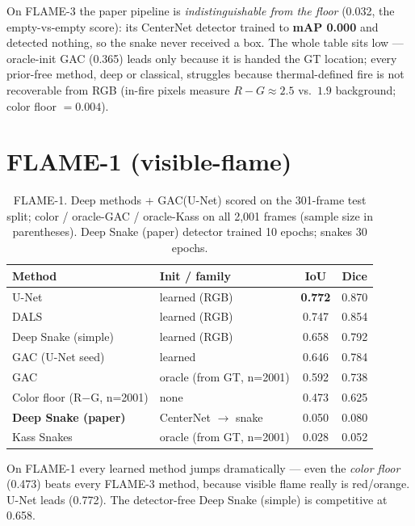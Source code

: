 \documentclass[10pt]{article}
\begin{document}
On FLAME-3 the paper pipeline is \emph{indistinguishable from the floor} (0.032,
the empty-vs-empty score): its CenterNet detector trained to \textbf{mAP 0.000} and
detected nothing, so the snake never received a box. The whole table sits low ---
oracle-init GAC (0.365) leads only because it is handed the GT location; every
prior-free method, deep or classical, struggles because thermal-defined fire is not
recoverable from RGB (in-fire pixels measure $R{-}G\approx2.5$ vs.\ $1.9$
background; color floor $=0.004$).

\section{FLAME-1 (visible-flame)}

\begin{table}[H]
\centering
\caption{FLAME-1. Deep methods + GAC(U-Net) scored on the 301-frame test split;
color / oracle-GAC / oracle-Kass on all 2{,}001 frames (sample size in
parentheses). Deep Snake (paper) detector trained 10 epochs; snakes 30 epochs.}
\begin{tabular}{llcc}
\toprule
Method & Init / family & IoU & Dice \\
\midrule
U-Net                       & learned (RGB)           & \textbf{0.772} & 0.870 \\
DALS                        & learned (RGB)           & 0.747 & 0.854 \\
Deep Snake (simple)         & learned (RGB)           & 0.658 & 0.792 \\
GAC (U-Net seed)            & learned                 & 0.646 & 0.784 \\
GAC                         & oracle (from GT, n=2001)& 0.592 & 0.738 \\
Color floor (R$-$G, n=2001) & none                    & 0.473 & 0.625 \\
\textbf{Deep Snake (paper)} & CenterNet $\to$ snake   & 0.050 & 0.080 \\
Kass Snakes                 & oracle (from GT, n=2001)& 0.028 & 0.052 \\
\bottomrule
\end{tabular}
\end{table}

On FLAME-1 every learned method jumps dramatically --- even the \emph{color floor}
(0.473) beats every FLAME-3 method, because visible flame really is red/orange.
U-Net leads (0.772). The detector-free Deep Snake (simple) is competitive at 0.658.
\end{document}

